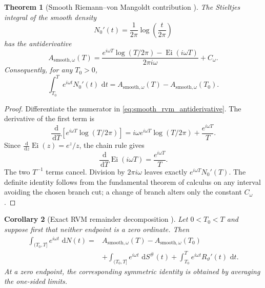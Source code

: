 \documentclass[11pt]{amsart}
\numberwithin{equation}{section}
\theoremstyle{plain}
\newtheorem{theorem}{Theorem}[section]
\newtheorem{corollary}[theorem]{Corollary}
\theoremstyle{definition}
\theoremstyle{remark}
\DeclareMathOperator{\Ei}{Ei}
\newcommand{\1}{\mathbf{1}}
\newcommand{\dd}{\,\mathrm{d}}
\begin{document}
\begin{theorem}[Smooth Riemann--von Mangoldt contribution {}]
\label{thm:smooth_rvm_contribution}
The Stieltjes integral of the smooth density
\begin{equation}
N_0'(t)
=
\frac1{2\pi}\log\!\left(\frac{t}{2\pi}\right)
\label{eq:N0_derivative}
\end{equation}
has the antiderivative
\begin{equation}
\boxed{
A_{\mathrm{smooth},\omega}(T)
=
\frac{
 e^{i\omega T}\log(T/2\pi)-\Ei(i\omega T)
}{2\pi i\omega}
+C_\omega.
}
\label{eq:smooth_rvm_antiderivative}
\end{equation}
Consequently, for any \(T_0>0\),
\begin{equation}
\int_{T_0}^{T}e^{i\omega t}N_0'(t)\,\dd t
=
A_{\mathrm{smooth},\omega}(T)
-
A_{\mathrm{smooth},\omega}(T_0).
\label{eq:smooth_rvm_definite}
\end{equation}
\end{theorem}

\begin{proof}
Differentiate the numerator in \eqref{eq:smooth_rvm_antiderivative}.
The derivative of the first term is
\begin{equation}
\frac{\dd}{\dd T}
\left[e^{i\omega T}\log(T/2\pi)\right]
=
i\omega e^{i\omega T}\log(T/2\pi)
+
\frac{e^{i\omega T}}{T}.
\label{eq:smooth_derivative_first}
\end{equation}
Since \(\frac{\dd}{\dd z}\Ei(z)=e^z/z\), the chain rule gives
\begin{equation}
\frac{\dd}{\dd T}\Ei(i\omega T)
=
\frac{e^{i\omega T}}{T}.
\label{eq:smooth_derivative_Ei}
\end{equation}
The two \(T^{-1}\) terms cancel.  Division by \(2\pi i\omega\)
leaves exactly \(e^{i\omega T}N_0'(T)\).  The definite identity follows
from the fundamental theorem of calculus on any interval avoiding the
chosen branch cut; a change of branch alters only the constant
\(C_\omega\).
\end{proof}


\begin{corollary}[Exact RVM remainder decomposition {}]
\label{cor:rvm_remainder_decomposition}
Let \(0<T_0<T\) and suppose first that neither endpoint is a zero
ordinate.  Then
\begin{align}
\int_{(T_0,T]}e^{i\omega t}\,\dd N(t)
={}&
A_{\mathrm{smooth},\omega}(T)
-
A_{\mathrm{smooth},\omega}(T_0)
\label{eq:rvm_remainder_decomposition_one}
\\
&+
\int_{(T_0,T]}e^{i\omega t}\,\dd S^{\#}(t)
+
\int_{T_0}^{T}e^{i\omega t}R_\vartheta'(t)\,\dd t.
\label{eq:rvm_remainder_decomposition_two}
\end{align}
At a zero endpoint, the corresponding symmetric identity is obtained by
averaging the one-sided limits.
\end{corollary}
\end{document}
